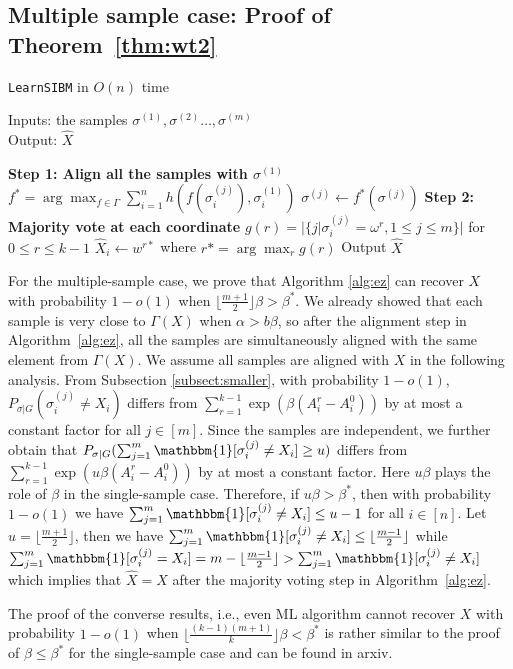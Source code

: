 \label{key}\documentclass[conference]{IEEEtran}
\begin{document}
\subsection{Multiple sample case: Proof of Theorem~\ref{thm:wt2}}
\label{sect:multi}

		\begin{algorithm}
			\caption{\texttt{LearnSIBM} in $O(n)$ time} \label{alg:ez}
			Inputs: the samples $\sigma^{(1)},\sigma^{(2)}\dots,\sigma^{(m)}$ \\
			Output: $\hat{X}$
			\begin{algorithmic}[1]
				\Statex 
				{\bf Step 1: Align all the samples with $\sigma^{(1)}$ }
				\State $f^* = \arg\max_{f \in \Gamma} \sum_{i=1}^n h(f(\sigma^{(j)}_i), \sigma^{(1)}_i)$
				\State $\sigma^{(j)} \gets f^*(\sigma^{(j)})$
				\EndFor
				\Statex
				{\bf Step 2: Majority vote at each coordinate}
				\State $g(r) = |\{j | \sigma^{(j)}_i = \omega^r,1\leq j \leq m\}|$  for $ 0 \leq r \leq k-1$
				\State $\hat{X}_i \gets w^{r*}$ where $r*=\arg\max_r g(r)$
			\State{}
				\EndFor
				\State Output $\hat{X}$
			\end{algorithmic}
		\end{algorithm}
For the multiple-sample case,
we prove that Algorithm \ref{alg:ez} can recover $X$ with probability $1-o(1)$ when $\lfloor \frac{m+1}{2} \rfloor \beta>\beta^\ast$.
We already showed that each sample is very close to $\Gamma(X)$ when $\alpha > b \beta$,
so after the alignment step in Algorithm~\ref{alg:ez},
all the samples are simultaneously aligned with the same element from $\Gamma(X)$.
We assume all samples are aligned with $X$ in the following analysis.
From Subsection \ref{subsect:smaller},
with probability $1-o(1)$, $P_{\sigma|G}(\sigma_i^{(j)} \neq X_i)$ differs from
$\sum_{r=1}^{k-1} \exp (\beta (A^r_i-A^0_i))$ by at most a constant factor for all $j\in[m]$.
Since the samples are independent,
we further obtain that $P_{\sigma|G}(\sum_{j=1}^m\mathbbm{1}[\sigma_i^{(j)} \neq X_i]\ge u)$ differs from $\sum_{r=1}^{k-1} \exp ( u \beta (A^r_i-A^0_i))$
by at most a constant factor.
Here $u\beta$ plays the role of $\beta$ in the single-sample case.
Therefore, if $u\beta>\beta^\ast$, then with probability $1-o(1)$ we have $\sum_{j=1}^m\mathbbm{1}[\sigma_i^{(j)} \neq X_i] \le u-1$ for all $i\in[n]$. Let $u=\lfloor \frac{m+1}{2} \rfloor$,
then we have $\sum_{j=1}^m\mathbbm{1}[\sigma_i^{(j)} \neq X_i] \le \lfloor \frac{m-1}{2} \rfloor $ while $\sum_{j=1}^m\mathbbm{1}[\sigma_i^{(j)} = X_i]
= m - \lfloor \frac{m-1}{2} \rfloor > \sum_{j=1}^m\mathbbm{1}[\sigma_i^{(j)} \neq X_i] $
which implies that $\hat{X}=X$ after the majority voting step in Algorithm~\ref{alg:ez}.

The proof of the converse results, i.e., even ML algorithm cannot recover $X$ with probability $1-o(1)$ when $\lfloor \frac{(k-1)(m+1)}{k} \rfloor  \beta < \beta^\ast$ is rather similar to the proof of $\beta\le\beta^\ast$ for the single-sample case and can be found in arxiv.




\end{document}
